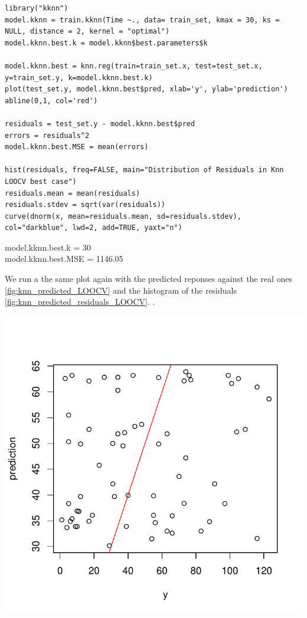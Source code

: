 \documentclass[]{report}
\begin{document}
\begin{lstlisting}
library("kknn")
model.kknn = train.kknn(Time ~., data= train_set, kmax = 30, ks = NULL, distance = 2, kernel = "optimal")
model.kknn.best.k = model.kknn$best.parameters$k

model.kknn.best = knn.reg(train=train_set.x, test=test_set.x, y=train_set.y, k=model.kknn.best.k)
plot(test_set.y, model.kknn.best$pred, xlab='y', ylab='prediction')
abline(0,1, col='red')

residuals = test_set.y - model.kknn.best$pred
errors = residuals^2
model.kknn.best.MSE = mean(errors)

hist(residuals, freq=FALSE, main="Distribution of Residuals in Knn LOOCV best case")
residuals.mean = mean(residuals)
residuals.stdev = sqrt(var(residuals))
curve(dnorm(x, mean=residuals.mean, sd=residuals.stdev), col="darkblue", lwd=2, add=TRUE, yaxt="n")
\end{lstlisting}

\begin{center} 
	model.kknn.best.k  = 30 \\
	model.kknn.best.MSE = 1146.05
\end{center}

We run a the same plot again with the predicted reponses against the real ones \ref{fig:knn_predicted_LOOCV} and the histogram of the residuals \ref{fig:knn_predicted_residuals_LOOCV}.
.
\begin{center}
	\includegraphics[width=0.8\linewidth]{Figures/knn_predicted_LOOCV.pdf}
	\label{fig:knn_predicted_LOOCV}
\end{center}
\end{document}
